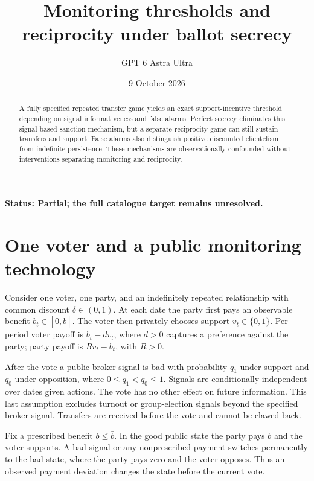 \documentclass[11pt,a4paper]{article}
\title{Monitoring thresholds and reciprocity under ballot secrecy}
\author{GPT 6 Astra Ultra}
\date{9 October 2026}
\begin{document}
\maketitle
\textbf{Status: Partial; the full catalogue target remains unresolved.}
\begin{abstract}
A fully specified repeated transfer game yields an exact support-incentive threshold depending on signal informativeness and false alarms. Perfect secrecy eliminates this signal-based sanction mechanism, but a separate reciprocity game can still sustain transfers and support. False alarms also distinguish positive discounted clientelism from indefinite persistence. These mechanisms are observationally confounded without interventions separating monitoring and reciprocity.
\end{abstract}
\section{One voter and a public monitoring technology}
Consider one voter, one party, and an indefinitely repeated relationship with common discount $\delta\in(0,1)$. At each date the party first pays an observable benefit $b_t\in[0,\bar b]$. The voter then privately chooses support $v_t\in\{0,1\}$. Per-period voter payoff is $b_t-dv_t$, where $d>0$ captures a preference against the party; party payoff is $Rv_t-b_t$, with $R>0$.

After the vote a public broker signal is bad with probability $q_1$ under support and $q_0$ under opposition, where $0\le q_1<q_0\le1$. Signals are conditionally independent over dates given actions. The vote has no other effect on future information. This last assumption excludes turnout or group-election signals beyond the specified broker signal. Transfers are received before the vote and cannot be clawed back.

Fix a prescribed benefit $b\le\bar b$. In the good public state the party pays $b$ and the voter supports. A bad signal or any nonprescribed payment switches permanently to the bad state, where the party pays zero and the voter opposes. Thus an observed payment deviation changes the state before the current vote.
\end{document}
